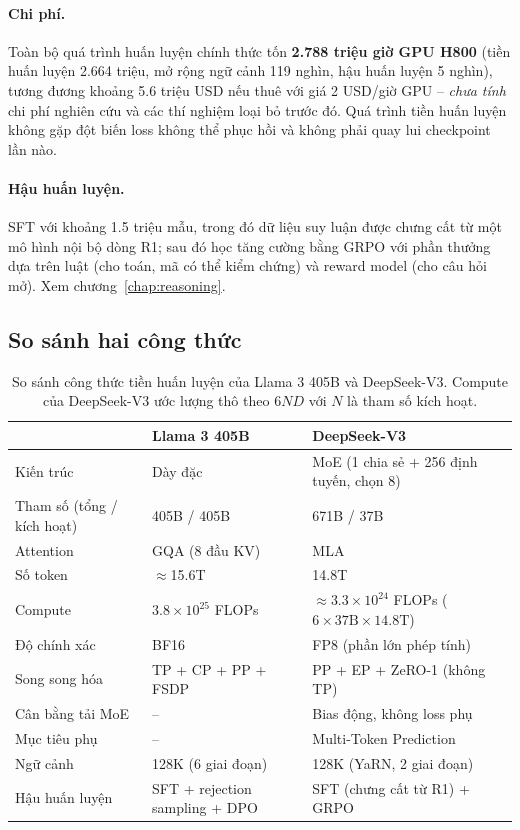 \paragraph{Chi phí.} Toàn bộ quá trình huấn luyện chính thức tốn \textbf{2.788 triệu giờ GPU H800} (tiền huấn luyện 2.664 triệu, mở rộng ngữ cảnh 119 nghìn, hậu huấn luyện 5 nghìn), tương đương khoảng 5.6 triệu USD nếu thuê với giá 2 USD/giờ GPU -- \emph{chưa tính} chi phí nghiên cứu và các thí nghiệm loại bỏ trước đó. Quá trình tiền huấn luyện không gặp đột biến loss không thể phục hồi và không phải quay lui checkpoint lần nào.

\paragraph{Hậu huấn luyện.} SFT với khoảng 1.5 triệu mẫu, trong đó dữ liệu suy luận được chưng cất từ một mô hình nội bộ dòng R1; sau đó học tăng cường bằng GRPO với phần thưởng dựa trên luật (cho toán, mã có thể kiểm chứng) và reward model (cho câu hỏi mở). Xem chương~\ref{chap:reasoning}.

\subsection{So sánh hai công thức}
\label{ssec:recipe_comparison}

\begin{table}[H]
\centering
\caption{So sánh công thức tiền huấn luyện của Llama 3 405B và DeepSeek-V3. Compute của DeepSeek-V3 ước lượng thô theo $6ND$ với $N$ là tham số kích hoạt.}
\label{tab:llama3_vs_deepseekv3}
\begin{tabularx}{\textwidth}{@{}lXX@{}}
\toprule
 & \textbf{Llama 3 405B} & \textbf{DeepSeek-V3} \\
\midrule
Kiến trúc & Dày đặc & MoE (1 chia sẻ + 256 định tuyến, chọn 8) \\
Tham số (tổng / kích hoạt) & 405B / 405B & 671B / 37B \\
Attention & GQA (8 đầu KV) & MLA \\
Số token & $\approx$15.6T & 14.8T \\
Compute & $3.8 \times 10^{25}$ FLOPs & $\approx 3.3 \times 10^{24}$ FLOPs ($6 \times 37\text{B} \times 14.8\text{T}$) \\
Độ chính xác & BF16 & FP8 (phần lớn phép tính) \\
Song song hóa & TP + CP + PP + FSDP & PP + EP + ZeRO-1 (không TP) \\
Cân bằng tải MoE & -- & Bias động, không loss phụ \\
Mục tiêu phụ & -- & Multi-Token Prediction \\
Ngữ cảnh & 128K (6 giai đoạn) & 128K (YaRN, 2 giai đoạn) \\
Hậu huấn luyện & SFT + rejection sampling + DPO & SFT (chưng cất từ R1) + GRPO \\
\bottomrule
\end{tabularx}
\end{table}

